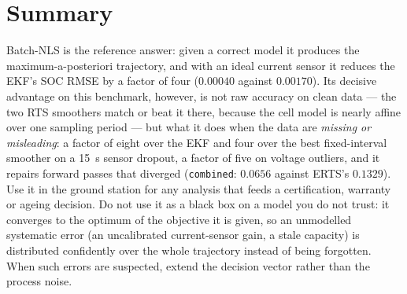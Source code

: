 \section{Summary}
Batch-NLS is the reference answer: given a correct model it produces the maximum-a-posteriori
trajectory, and with an ideal current sensor it reduces the EKF's SOC RMSE by a factor of four
($0.00040$ against $0.00170$).  Its decisive advantage on this benchmark, however, is not raw
accuracy on clean data --- the two RTS smoothers match or beat it there, because the cell model is
nearly affine over one sampling period --- but what it does when the data are \emph{missing or
misleading}: a factor of eight over the EKF and four over the best fixed-interval smoother on a
\SI{15}{\second} sensor dropout, a factor of five on voltage outliers, and it repairs forward passes
that diverged (\texttt{combined}: $0.0656$ against ERTS's $0.1329$).  Use it in
the ground station for any analysis that feeds a certification, warranty or ageing decision.  Do not
use it as a black box on a model you do not trust: it converges to the optimum of the objective it
is given, so an unmodelled systematic error (an uncalibrated current-sensor gain, a stale capacity)
is distributed confidently over the whole trajectory instead of being forgotten.  When such errors
are suspected, extend the decision vector rather than the process noise.
